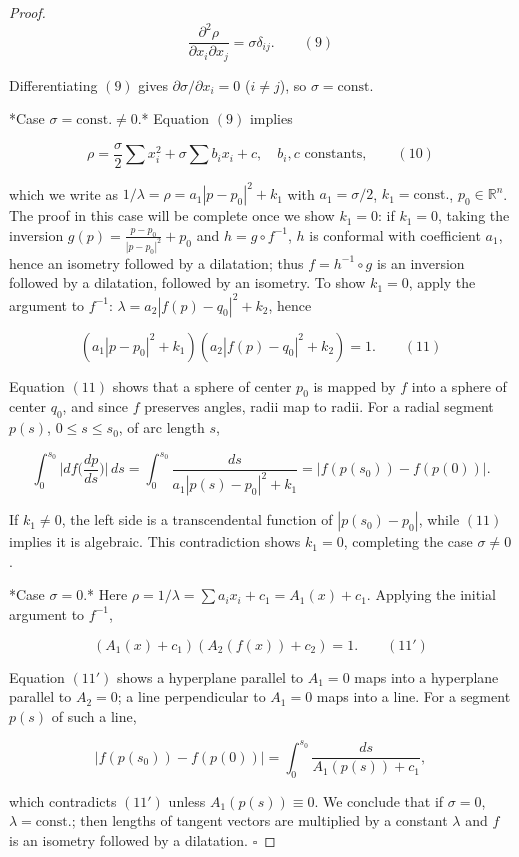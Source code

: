 \begin{proof}
  $$
  \frac{\partial^2\rho}{\partial x_i\partial x_j}=\sigma\delta_{ij}.\qquad(9)
  $$
  
  Differentiating $(9)$ gives $\partial\sigma/\partial x_i=0$ ($i\neq j$), so
  $\sigma=\text{const.}$
  
  *Case $\sigma=\text{const.}\neq 0$.* Equation $(9)$ implies
  
  $$
  \rho=\frac{\sigma}{2}\sum x_i^2+\sigma\sum b_i x_i+c,\quad b_i,c\text{ constants},\qquad(10)
  $$
  
  which we write as $1/\lambda=\rho=a_1|p-p_0|^2+k_1$ with $a_1=\sigma/2$,
  $k_1=\text{const.}$, $p_0\in\mathbb{R}^n$. The proof in this case will be complete
  once we show $k_1=0$: if $k_1=0$, taking the inversion
  $g(p)=\frac{p-p_0}{|p-p_0|^2}+p_0$ and $h=g\circ f^{-1}$, $h$ is conformal with
  coefficient $a_1$, hence an isometry followed by a dilatation; thus
  $f=h^{-1}\circ g$ is an inversion followed by a dilatation, followed by an
  isometry. To show $k_1=0$, apply the argument to $f^{-1}$:
  $\lambda=a_2|f(p)-q_0|^2+k_2$, hence
  
  $$
  (a_1|p-p_0|^2+k_1)(a_2|f(p)-q_0|^2+k_2)=1.\qquad(11)
  $$
  
  Equation $(11)$ shows that a sphere of center $p_0$ is mapped by $f$ into a sphere
  of center $q_0$, and since $f$ preserves angles, radii map to radii. For a radial
  segment $p(s)$, $0\leq s\leq s_0$, of arc length $s$,
  
  $$
  \int_0^{s_0}\Big|df\Big(\frac{dp}{ds}\Big)\Big|\,ds=\int_0^{s_0}\frac{ds}{a_1|p(s)-p_0|^2+k_1}=|f(p(s_0))-f(p(0))|.
  $$
  
  If $k_1\neq 0$, the left side is a transcendental function of $|p(s_0)-p_0|$, while
  $(11)$ implies it is algebraic. This contradiction shows $k_1=0$, completing the
  case $\sigma\neq0$.
  
  *Case $\sigma=0$.* Here $\rho=1/\lambda=\sum a_i x_i+c_1=A_1(x)+c_1$. Applying the
  initial argument to $f^{-1}$,
  
  $$
  (A_1(x)+c_1)(A_2(f(x))+c_2)=1.\qquad(11')
  $$
  
  Equation $(11')$ shows a hyperplane parallel to $A_1=0$ maps into a hyperplane
  parallel to $A_2=0$; a line perpendicular to $A_1=0$ maps into a line. For a
  segment $p(s)$ of such a line,
  
  $$
  |f(p(s_0))-f(p(0))|=\int_0^{s_0}\frac{ds}{A_1(p(s))+c_1},
  $$
  
  which contradicts $(11')$ unless $A_1(p(s))\equiv 0$. We conclude that if
  $\sigma=0$, $\lambda=\text{const.}$; then lengths of tangent vectors are multiplied
  by a constant $\lambda$ and $f$ is an isometry followed by a dilatation. $\square$
\end{proof}

